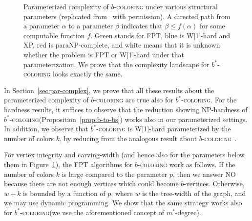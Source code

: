 \documentclass[runningheads, envcountsame]{llncs}
\newcommand{\FPT}{\textsf{FPT}\xspace}
\newcommand{\NP}{\textsf{NP}\xspace}
\newcommand{\Wone}{\textsf{W[1]}\xspace}
\newcommand{\bscoloring}{$b^*$-\textsc{coloring}\xspace}
\newcommand{\bcoloring}{$b$-\textsc{coloring}\xspace}
\begin{document}
\begin{figure}[t]
{}

\caption{Parameterized complexity of \bcoloring under various structural parameters (replicated from~\cite{DBLP:conf/mfcs/Balaban26} with permission). A directed path from a parameter $\alpha$ to a parameter $\beta$ indicates that $\beta \le f(\alpha)$ for some computable function $f$. Green stands for \FPT, blue is \textsf{W[1]}-hard and \textsf{XP}, red is \textsf{paraNP}-complete, and white means that it is unknown whether the problem is \FPT or \textsf{W[1]}-hard under that parameterization. We prove that the complexity landscape for \bscoloring looks exactly the same.}
\label{fig:hierarchy}
\end{figure}

In Section~\ref{sec:par-complex}, we prove that all these results about the parameterized complexity of \bcoloring are true also for \bscoloring.
For the hardness results, it suffices to observe that the reduction showing \NP-hardness of \bscoloring (Proposition~\ref{prop:b-to-bs}) works also in our parameterized settings.
In addition, we observe that \bscoloring is \Wone-hard parameterized by the number of colors $k$, by reducing from the analogous result about \bcoloring~\cite{DBLP:journals/jcss/PanolanPS17}.

For vertex integrity and carving-width (and hence also for the parameters below them in Figure~\ref{fig:hierarchy}), the \FPT algorithms for \bcoloring work as follows.
If the number of colors $k$ is large compared to the parameter $p$, then we answer NO because there are not enough vertices which could become $b$-vertices.
Otherwise, $w + k$ is bounded by a function of $p$, where $w$ is the tree-width of the graph, and we may use dynamic programming.
We show that the same strategy works also for \bscoloring (we use the aforementioned concept of $m^*$-degree).
\end{document}
